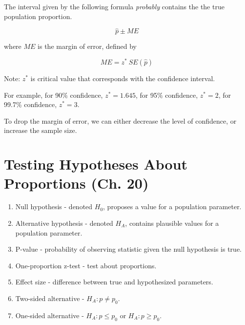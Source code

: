\documentclass{article}
\theoremstyle{definition}
\begin{document}
The interval given by the following formula \textit{probably} contains the the true population proportion.

\begin{equation}
    \hat{p} \pm ME
\end{equation}

where $ME$ is the margin of error, defined by

\begin{equation}
    ME = z^*\ SE(\hat{p})
\end{equation}

Note: $z^*$ is critical value that corresponds with the confidence interval.

For example, for 90\% confidence, $z^* = 1.645$, for 95\% confidence, $z^* = 2$, for 99.7\% confidence, $z^* = 3$.

To drop the margin of error, we can either decrease the level of confidence, or increase the sample size.

\pagebreak

\section{Testing Hypotheses About Proportions (Ch. 20)}

\begin{enumerate}[label=\textbf{\roman*.}]
    \item Null hypothesis - denoted $H_0$, proposes a value for a population parameter.

    \item Alternative hypothesis - denoted $H_A$, contains plausible values for a population parameter.

    \item P-value - probability of observing statistic given the null hypothesis is true.

    \item One-proportion z-test - test about proportions.

    \item Effect size - difference between true and hypothesized parameters.

    \item Two-sided alternative - $H_A: p \neq p_0$.

    \item One-sided alternative - $H_A: p \leq p_0$ or $H_A: p \geq p_0$.

\end{enumerate}
\end{document}
